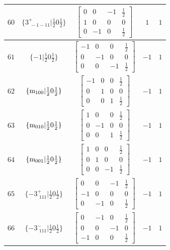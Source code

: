 \documentclass[fleqn,8pt]{jsarticle}
\begin{document}
\begin{longtable}{ccccc}
$ 60 $ & $ \{3^{+}_{\,\,-1-11}|\frac{1}{2} 0 \frac{1}{2}\} $ & $ \begin{bmatrix} 0 & 0 & -1 & \frac{1}{2} \\ 1 & 0 & 0 & 0 \\ 0 & -1 & 0 & \frac{1}{2} \end{bmatrix} $ & $ 1 $ & $ 1 $ \\ \hline
$ 61 $ & $ \{-1|\frac{1}{2} 0 \frac{1}{2}\} $ & $ \begin{bmatrix} -1 & 0 & 0 & \frac{1}{2} \\ 0 & -1 & 0 & 0 \\ 0 & 0 & -1 & \frac{1}{2} \end{bmatrix} $ & $ -1 $ & $ 1 $ \\ \hline
$ 62 $ & $ \{{\rm m}_{100}|\frac{1}{2} 0 \frac{1}{2}\} $ & $ \begin{bmatrix} -1 & 0 & 0 & \frac{1}{2} \\ 0 & 1 & 0 & 0 \\ 0 & 0 & 1 & \frac{1}{2} \end{bmatrix} $ & $ -1 $ & $ 1 $ \\ \hline
$ 63 $ & $ \{{\rm m}_{010}|\frac{1}{2} 0 \frac{1}{2}\} $ & $ \begin{bmatrix} 1 & 0 & 0 & \frac{1}{2} \\ 0 & -1 & 0 & 0 \\ 0 & 0 & 1 & \frac{1}{2} \end{bmatrix} $ & $ -1 $ & $ 1 $ \\ \hline
$ 64 $ & $ \{{\rm m}_{001}|\frac{1}{2} 0 \frac{1}{2}\} $ & $ \begin{bmatrix} 1 & 0 & 0 & \frac{1}{2} \\ 0 & 1 & 0 & 0 \\ 0 & 0 & -1 & \frac{1}{2} \end{bmatrix} $ & $ -1 $ & $ 1 $ \\ \hline
$ 65 $ & $ \{-3^{+}_{\,\,111}|\frac{1}{2} 0 \frac{1}{2}\} $ & $ \begin{bmatrix} 0 & 0 & -1 & \frac{1}{2} \\ -1 & 0 & 0 & 0 \\ 0 & -1 & 0 & \frac{1}{2} \end{bmatrix} $ & $ -1 $ & $ 1 $ \\ \hline
$ 66 $ & $ \{-3^{-}_{\,\,111}|\frac{1}{2} 0 \frac{1}{2}\} $ & $ \begin{bmatrix} 0 & -1 & 0 & \frac{1}{2} \\ 0 & 0 & -1 & 0 \\ -1 & 0 & 0 & \frac{1}{2} \end{bmatrix} $ & $ -1 $ & $ 1 $ \\ \hline

\end{longtable}
\end{document}
